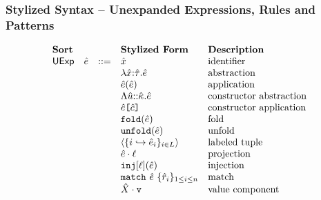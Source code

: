 \clearpage

\subsubsection{Stylized Syntax -- Unexpanded Expressions, Rules and Patterns}
\[\begin{array}{lllllll}
\textbf{Sort} & & 
& \textbf{Stylized Form} & \textbf{Description}\\
\mathsf{UExp} & {\hat e} & ::= 
& {\hat x} & \text{identifier}\\
&&
& \lambda {\hat x}{:}{\hat\tau}.{\hat e} & \text{abstraction}\\
&&
& {\hat e}({\hat e}) & \text{application}\\
&&
& \Lambda {\hat u}{::}{\hat\kappa}.{\hat e} & \text{constructor abstraction}\\
&&
& {\hat e}\texttt{[}{\hat c}\texttt{]} & \text{constructor application}\\
&&
& \texttt{fold}({\hat e}) & \text{fold}\\
&&
& \texttt{unfold}({\hat e}) & \text{unfold}\\
&&
& \langle \{i \hookrightarrow {\hat e}_{i}\}_{i \in L}\rangle & \text{labeled tuple}\\
&&
& {\hat e} \cdot \ell & \text{projection}\\
&&
& \texttt{inj}[\ell]({\hat e}) & \text{injection}\\
&&
& \texttt{match}~{\hat e}~\{\hat{r}_{i}\}_{1 \leq i \leq n} & \text{match}\\
&&
& {\hat X} \cdot \texttt{v} & \text{value component}\\

\end{array}\]
